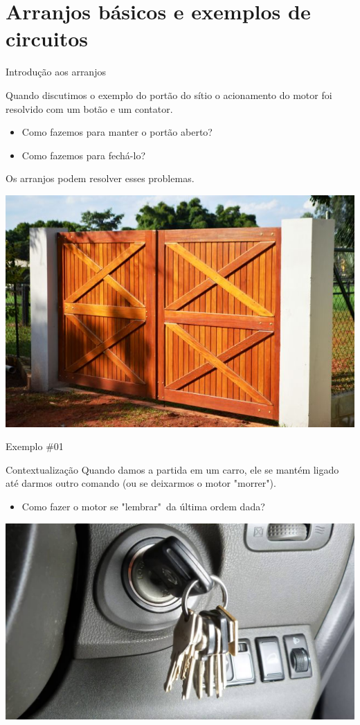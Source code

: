 \section{Arranjos básicos e exemplos de circuitos}

\begin{frame}{Introdução aos arranjos}
\begin{block}{}
	Quando discutimos o exemplo do portão do sítio o acionamento do motor foi resolvido com um botão e um contator.
	\begin{itemize}
		\item Como fazemos para manter o portão aberto?
		\item Como fazemos para fechá-lo?
	\end{itemize}
	Os arranjos podem resolver esses problemas.
\end{block}

\centerline{\includegraphics[width=0.6\linewidth]{Figuras/Ch07/fig0.jpg}}
\end{frame}

\begin{frame}{Exemplo \#01}
\begin{block}{Contextualização}
	Quando damos a partida em um carro, ele se mantém ligado até darmos outro comando (ou se deixarmos o motor "morrer").
	
	\begin{itemize}
		\item Como fazer o motor se "lembrar"~da última ordem dada?
	\end{itemize}
\end{block}

\centerline{\includegraphics[width=0.8\linewidth]{Figuras/Ch07/fig1.jpg}}
\end{frame}


